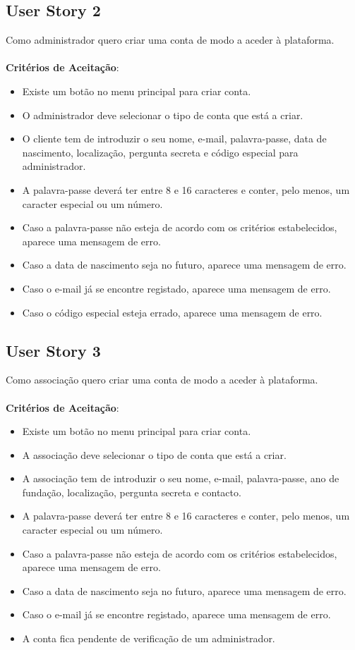 \documentclass[a4paper,11pt]{article}
\begin{document}
\subsection{User Story 2}
Como administrador quero criar uma conta de modo a aceder à plataforma.\\\\
\textbf{Critérios de Aceitação}:
\begin{itemize}
  \item Existe um botão no menu principal para criar conta.
  \item O administrador deve selecionar o tipo de conta que está a criar.
  \item O cliente tem de introduzir o seu nome, e-mail, palavra-passe, data de nascimento, localização, pergunta secreta e código especial para administrador.
  \item A palavra-passe deverá ter entre 8 e 16 caracteres e conter, pelo menos, um caracter especial ou um número.
  \item Caso a palavra-passe não esteja de acordo com os critérios estabelecidos, aparece uma mensagem de erro.
  \item Caso a data de nascimento seja no futuro, aparece uma mensagem de erro.
  \item Caso o e-mail já se encontre registado, aparece uma mensagem de erro.
  \item Caso o código especial esteja errado, aparece uma mensagem de erro.
\end{itemize}

\subsection{User Story 3}
Como associação quero criar uma conta de modo a aceder à plataforma.\\\\
\textbf{Critérios de Aceitação}:
\begin{itemize}
  \item Existe um botão no menu principal para criar conta.
  \item A associação deve selecionar o tipo de conta que está a criar.
  \item A associação tem de introduzir o seu nome, e-mail, palavra-passe, ano de fundação, localização, pergunta secreta e contacto.
  \item A palavra-passe deverá ter entre 8 e 16 caracteres e conter, pelo menos, um caracter especial ou um número.
  \item Caso a palavra-passe não esteja de acordo com os critérios estabelecidos, aparece uma mensagem de erro.
  \item Caso a data de nascimento seja no futuro, aparece uma mensagem de erro.
  \item Caso o e-mail já se encontre registado, aparece uma mensagem de erro.
  \item A conta fica pendente de verificação de um administrador.
\end{itemize}
\end{document}
